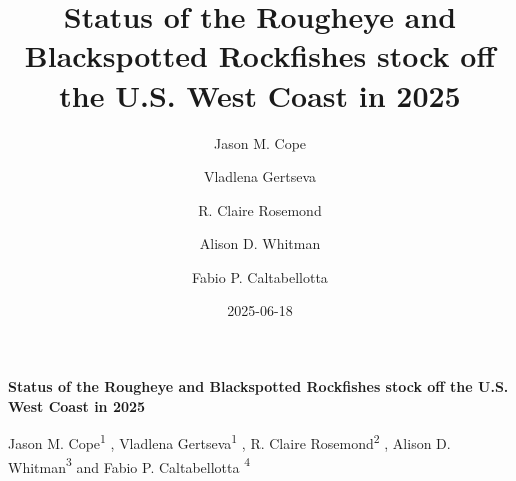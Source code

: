 \documentclass[
]{scrartcl}
\title{Status of the Rougheye and Blackspotted Rockfishes stock off the
U.S. West Coast in 2025}
\author{Jason M. Cope \and Vladlena Gertseva \and R. Claire
Rosemond \and Alison D. Whitman \and Fabio P. Caltabellotta}
\date{2025-06-18}
\begin{document}
  \begin{titlepage}

  \begin{minipage}[b][\textheight][s]{\textwidth}


  \raggedright




  {\huge\bfseries\nohyphens{Status of the Rougheye and Blackspotted
  Rockfishes stock off the U.S. West Coast in 2025}}\\[1\baselineskip]



  \vspace{1\baselineskip}


  \vspace{1\baselineskip}

   {\large{Jason M. Cope}}{\textsuperscript{1}}%
  ,
   {\large{Vladlena Gertseva}}{\textsuperscript{1}}%
  ,
   {\large{R. Claire Rosemond}}{\textsuperscript{2}}%
  ,
   {\large{Alison D. Whitman}}{\textsuperscript{3}}%
  { and \large{Fabio P. Caltabellotta}}%
  {\textsuperscript{4}}%



  \vspace{2\baselineskip}


\end{minipage}
\end{titlepage}
\end{document}
